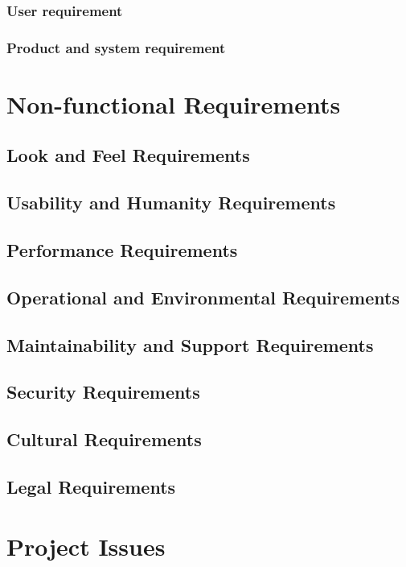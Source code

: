 \documentclass{article}
\begin{document}
\subsubsection{User requirement}
\subsubsection{Product and system requirement}

\section{Non-functional Requirements}
\subsection{Look and Feel Requirements}
\subsection{Usability and Humanity Requirements}
\subsection{Performance Requirements}
\subsection{Operational and Environmental Requirements}
\subsection{Maintainability and Support Requirements}
\subsection{Security Requirements}
\subsection{Cultural Requirements}
\subsection{Legal Requirements}

\newpage
\section{Project Issues}
\end{document}
